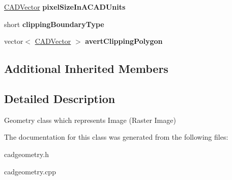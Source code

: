 \begin{DoxyCompactItemize}
\item 
\hyperlink{class_c_a_d_vector}{C\+A\+D\+Vector} {\bfseries pixel\+Size\+In\+A\+C\+A\+D\+Units}\hypertarget{class_c_a_d_image_a963c7c65f866d1e7ca74b643d0104c3a}{}\label{class_c_a_d_image_a963c7c65f866d1e7ca74b643d0104c3a}

\item 
short {\bfseries clipping\+Boundary\+Type}\hypertarget{class_c_a_d_image_a5e74db472d61a9fc85aafdfe6d3dc798}{}\label{class_c_a_d_image_a5e74db472d61a9fc85aafdfe6d3dc798}

\item 
vector$<$ \hyperlink{class_c_a_d_vector}{C\+A\+D\+Vector} $>$ {\bfseries avert\+Clipping\+Polygon}\hypertarget{class_c_a_d_image_acbe02cefac39b90208d57a445e114dbc}{}\label{class_c_a_d_image_acbe02cefac39b90208d57a445e114dbc}

\end{DoxyCompactItemize}
\subsection*{Additional Inherited Members}


\subsection{Detailed Description}
Geometry class which represents Image (Raster Image) 

The documentation for this class was generated from the following files\+:\begin{DoxyCompactItemize}
\item 
cadgeometry.\+h\item 
cadgeometry.\+cpp\end{DoxyCompactItemize}
